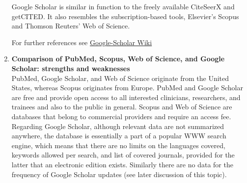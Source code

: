 \begin{enumerate}
	Google Scholar is similar in function to the freely available CiteSeerX and getCITED. It also resembles the subscription-based tools, Elsevier's Scopus and Thomson Reuters' Web of Science.
		
	For further references see \href{https://en.wikipedia.org/wiki/Google_Scholar}{Google-Scholar Wiki}
	
	\item\textbf{Comparison of PubMed, Scopus, Web of Science, and
		Google Scholar: strengths and weaknesses}\\
	
	PubMed, Google Scholar, and Web of Science originate from the United States, whereas Scopus originates from Europe. PubMed and Google Scholar are free and
	provide open access to all interested clinicians, researchers, and trainees and also to the public in general. Scopus and Web of Science are databases that
	belong to commercial providers and require an access fee. Regarding Google Scholar, although relevant data are not summarized anywhere, the database is essentially a part of a popular WWW search engine, which means that there are no limits on the languages covered, keywords allowed per search, and list of covered journals, provided for the latter that an electronic edition exists. Similarly there are no data for the frequency of Google Scholar updates (see later discussion of this topic).\\
	

\end{enumerate}
